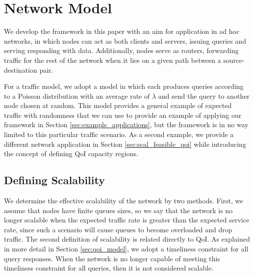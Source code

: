 \section{Network Model}
\label{sec:network_model}

We develop the framework in this paper with an aim for application in ad hoc networks, in which nodes can act as both clients and servers, issuing queries and serving responding with data.  Additionally, nodes serve as routers, forwarding traffic for the rest of the network when it lies on a given path between a source-destination pair.  

For a traffic model, we adopt a model in which each produces queries according to a Poisson distribution with an average rate of $\lambda$ and send the query to another node chosen at random.
This model provides a general example of expected traffic with randomness that we can use to provide an example of applying our framework in Section \ref{sec:example_applications}, but the framework is in no way limited to this particular traffic scenario.  As a second example, we provide a different network application in Section \ref{sec:scal_feasible_qoi} while introducing the concept of defining QoI capacity regions.  

\subsection{Defining Scalability}

We determine the effective scalability of the network by two methods.  First, we assume that nodes have finite queues sizes, so we say that the network is no longer scalable when the expected traffic rate is greater than the expected service rate, since such a scenario will cause queues to become overloaded and drop traffic.  The second definition of scalability is related directly to QoI.  As explained in more detail in Section \ref{sec:qoi_model}, we adopt a timeliness constraint for all query responses.  When the network is no longer capable of meeting this timeliness constraint for all queries, then it is not considered scalable.  